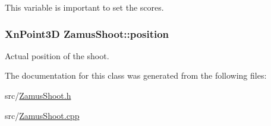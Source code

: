 This variable is important to set the scores. \hypertarget{classZamusShoot_a1705d9588502985250c1732ee1215c41}{
\subsubsection[{position}]{\setlength{\rightskip}{0pt plus 5cm}XnPoint3D {\bf ZamusShoot::position}}}
\label{classZamusShoot_a1705d9588502985250c1732ee1215c41}
Actual position of the shoot. 

The documentation for this class was generated from the following files:\begin{DoxyCompactItemize}
\item 
src/\hyperlink{ZamusShoot_8h}{ZamusShoot.h}\item 
src/\hyperlink{ZamusShoot_8cpp}{ZamusShoot.cpp}\end{DoxyCompactItemize}
